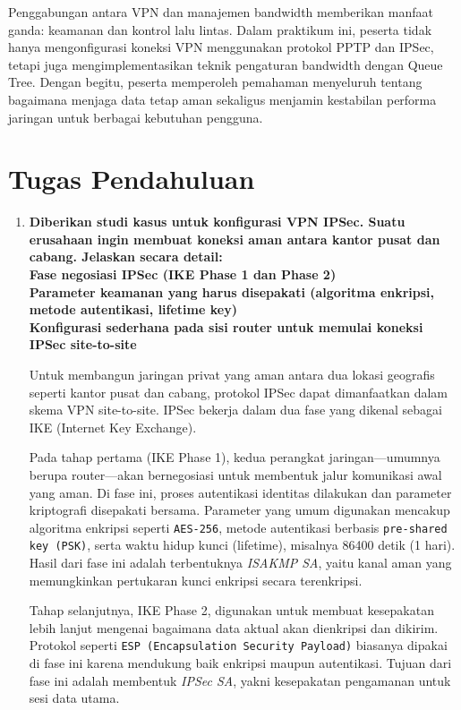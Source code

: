 Penggabungan antara VPN dan manajemen bandwidth memberikan manfaat ganda: keamanan dan kontrol lalu lintas. Dalam praktikum ini, peserta tidak hanya mengonfigurasi koneksi VPN menggunakan protokol PPTP dan IPSec, tetapi juga mengimplementasikan teknik pengaturan bandwidth dengan Queue Tree. Dengan begitu, peserta memperoleh pemahaman menyeluruh tentang bagaimana menjaga data tetap aman sekaligus menjamin kestabilan performa jaringan untuk berbagai kebutuhan pengguna.

\section{Tugas Pendahuluan}
\begin{enumerate}
    \item \textbf{Diberikan studi kasus untuk konfigurasi VPN IPSec. Suatu erusahaan ingin membuat koneksi aman antara kantor pusat dan cabang. Jelaskan secara detail:\\
Fase negosiasi IPSec (IKE Phase 1 dan Phase 2)\\
Parameter keamanan yang harus disepakati (algoritma enkripsi, metode autentikasi, lifetime key)\\
Konfigurasi sederhana pada sisi router untuk memulai koneksi IPSec site-to-site\\}

    Untuk membangun jaringan privat yang aman antara dua lokasi geografis seperti kantor pusat dan cabang, protokol IPSec dapat dimanfaatkan dalam skema VPN site-to-site. IPSec bekerja dalam dua fase yang dikenal sebagai IKE (Internet Key Exchange).

    Pada tahap pertama (IKE Phase 1), kedua perangkat jaringan—umumnya berupa router—akan bernegosiasi untuk membentuk jalur komunikasi awal yang aman. Di fase ini, proses autentikasi identitas dilakukan dan parameter kriptografi disepakati bersama. Parameter yang umum digunakan mencakup algoritma enkripsi seperti \texttt{AES-256}, metode autentikasi berbasis \texttt{pre-shared key (PSK)}, serta waktu hidup kunci (lifetime), misalnya 86400 detik (1 hari). Hasil dari fase ini adalah terbentuknya \textit{ISAKMP SA}, yaitu kanal aman yang memungkinkan pertukaran kunci enkripsi secara terenkripsi.

    Tahap selanjutnya, IKE Phase 2, digunakan untuk membuat kesepakatan lebih lanjut mengenai bagaimana data aktual akan dienkripsi dan dikirim. Protokol seperti \texttt{ESP (Encapsulation Security Payload)} biasanya dipakai di fase ini karena mendukung baik enkripsi maupun autentikasi. Tujuan dari fase ini adalah membentuk \textit{IPSec SA}, yakni kesepakatan pengamanan untuk sesi data utama.


\end{enumerate}
